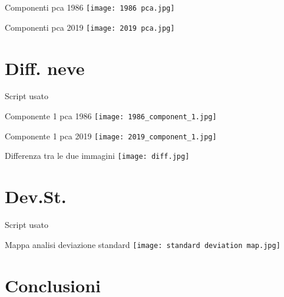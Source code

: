 \documentclass{beamer}
\begin{document}
\begin{frame}{Componenti pca 1986}
    \texttt{[image: 1986 pca.jpg]}
    \centering
\end{frame}

\begin{frame}{Componenti pca 2019}
    \texttt{[image: 2019 pca.jpg]}
    \centering
\end{frame}

\section{Diff. neve}

\begin{frame}{Script usato}
    \begin{tiny}
        
    \end{tiny}
\end{frame}

\begin{frame}{Componente 1 pca 1986}
    \texttt{[image: 1986\_component\_1.jpg]}
    \centering
\end{frame}

\begin{frame}{Componente 1 pca 2019}
    \texttt{[image: 2019\_component\_1.jpg]}
    \centering
\end{frame}

\begin{frame}{Differenza tra le due immagini}
    \texttt{[image: diff.jpg]}
    \centering
\end{frame}

\section{Dev.St.}

\begin{frame}{Script usato}
    \begin{tiny}
        
    \end{tiny}
\end{frame}

\begin{frame}{Mappa analisi deviazione standard}
    \texttt{[image: standard deviation map.jpg]}
    \centering
\end{frame}

\section{Conclusioni}
\end{document}
